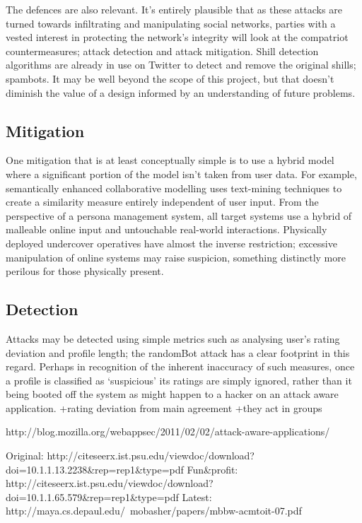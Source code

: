 The defences are also relevant. It’s entirely plausible that as these attacks are turned towards infiltrating and manipulating social networks, parties with a vested interest in protecting the network’s integrity will look at the compatriot countermeasures; attack detection and attack mitigation. Shill detection algorithms are already in use on Twitter to detect and remove the original shills; spambots. It may be well beyond the scope of this project, but that doesn’t diminish the value of a design informed by an understanding of future problems.

\subsection{Mitigation}

One mitigation that is at least conceptually simple  is to use a hybrid model where a significant portion of the model isn’t taken from user data. For example, semantically enhanced collaborative modelling uses text-mining techniques to create a similarity measure entirely independent of user input. From the perspective of a persona management system, all target systems use a hybrid of malleable online input and untouchable real-world interactions. Physically deployed undercover operatives have almost the inverse restriction; excessive manipulation of online systems may raise suspicion, something distinctly more perilous for those physically present.

\subsection{Detection}
Attacks may be detected using simple metrics such as analysing user’s rating deviation and profile length; the randomBot attack has a clear footprint in this regard. Perhaps in recognition of the inherent inaccuracy of such measures, once a profile is classified as `suspicious' its ratings are simply ignored, rather than it being booted off the system as might happen to a hacker on an attack aware application.
+rating deviation from main agreement
+they act in groups


http://blog.mozilla.org/webappsec/2011/02/02/attack-aware-applications/

Original: http://citeseerx.ist.psu.edu/viewdoc/download?doi=10.1.1.13.2238\&rep=rep1\&type=pdf
Fun&profit: http://citeseerx.ist.psu.edu/viewdoc/download?doi=10.1.1.65.579\&rep=rep1\&type=pdf
Latest: http://maya.cs.depaul.edu/~mobasher/papers/mbbw-acmtoit-07.pdf
